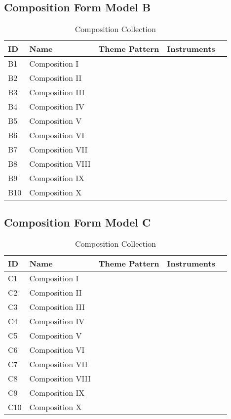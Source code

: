 \subsection{Composition Form Model B}

\begin{table}[H]
\caption{Composition Collection}	
\begin{tabular}{p{1cm}p{4cm}p{2cm}p{1cm}p{1cm}}
\hline
ID & Name & Theme Pattern & Instruments & \\
\hline 
B1 & Composition I &  &  & \\
B2 & Composition II &  &  & \\
B3 & Composition III &  & \\
B4 & Composition IV & & \\
B5 & Composition V & & & \\
\hline 
B6 & Composition VI &  &  & \\
B7 & Composition VII &  &  & \\
B8 & Composition VIII &  & \\
B9 & Composition IX & & \\
B10 & Composition X & & & \\
\end{tabular}
\end{table}

\subsection{Composition Form Model C}


\begin{table}[H]
\caption{Composition Collection}	
\begin{tabular}{p{1cm}p{4cm}p{2cm}p{1cm}p{1cm}}
\hline
ID & Name & Theme Pattern & Instruments & \\
\hline 
C1 & Composition I &  &  & \\
C2 & Composition II &  &  & \\
C3 & Composition III &  & \\
C4 & Composition IV & & \\
C5 & Composition V & & & \\
\hline 
C6 & Composition VI &  &  & \\
C7 & Composition VII &  &  & \\
C8 & Composition VIII &  & \\
C9 & Composition IX & & \\
C10 & Composition X & & & \\
\end{tabular}
\end{table}


